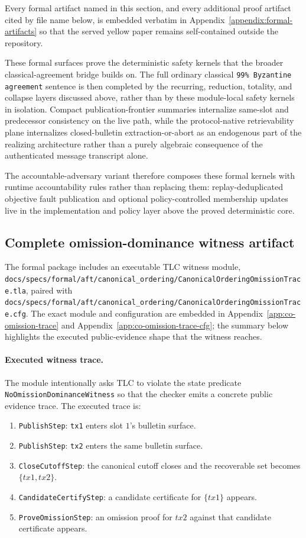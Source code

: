 \documentclass[11pt]{article}
\newcommand{\code}[1]{\texttt{#1}}
\begin{document}
Every formal artifact named in this section, and every additional proof
artifact cited by file name below, is embedded verbatim in
Appendix~\ref{appendix:formal-artifacts} so that the served yellow paper
remains self-contained outside the repository.

These formal surfaces prove the deterministic safety kernels that the broader
classical-agreement bridge builds on. The full ordinary classical
\code{99\% Byzantine agreement} sentence is then completed by the recurring,
reduction, totality, and collapse layers discussed above, rather than by these
module-local safety kernels in isolation. Compact publication-frontier
summaries internalize same-slot and predecessor consistency on the live path,
while the protocol-native retrievability plane internalizes closed-bulletin
extraction-or-abort as an endogenous part of the realizing architecture rather
than a purely algebraic consequence of the authenticated message transcript
alone.

The accountable-adversary variant therefore composes these formal kernels with
runtime accountability rules rather than replacing them: replay-deduplicated
objective fault publication and optional policy-controlled membership updates
live in the implementation and policy layer above the proved
deterministic core.

\subsection{Complete omission-dominance witness artifact}

The formal package includes an executable TLC witness module,
\code{docs/specs/formal/aft/canonical\_ordering/CanonicalOrderingOmissionTrace.tla},
paired with
\code{docs/specs/formal/aft/canonical\_ordering/CanonicalOrderingOmissionTrace.cfg}.
The exact module and configuration are embedded in
Appendix~\ref{app:co-omission-trace} and
Appendix~\ref{app:co-omission-trace-cfg}; the summary below highlights the
executed public-evidence shape that the witness reaches.

\paragraph{Executed witness trace.}
The module intentionally asks TLC to violate the state predicate
\code{NoOmissionDominanceWitness} so that the checker emits a concrete public
evidence trace. The executed trace is:

\begin{enumerate}[leftmargin=1.5em]
\item \code{PublishStep}: \code{tx1} enters slot \(1\)'s bulletin surface.
\item \code{PublishStep}: \code{tx2} enters the same bulletin surface.
\item \code{CloseCutoffStep}: the canonical cutoff closes and the recoverable
set becomes \(\{tx1, tx2\}\).
\item \code{CandidateCertifyStep}: a candidate certificate for \(\{tx1\}\)
appears.
\item \code{ProveOmissionStep}: an omission proof for \(tx2\) against that
candidate certificate appears.
\end{enumerate}
\end{document}
